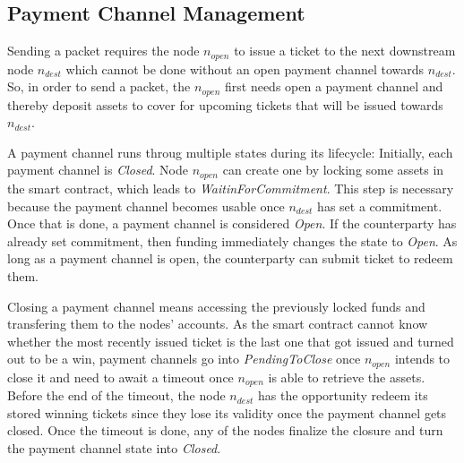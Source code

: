 \subsection{Payment Channel Management}
\label{sec:incentives:channels}

Sending a packet requires the node $n_{open}$ to issue a ticket to the next downstream node $n_{dest}$ which cannot be done without an open payment channel towards $n_{dest}$. So, in order to send a packet, the $n_{open}$ first needs open a payment channel and thereby deposit assets to cover for upcoming tickets that will be issued towards $n_{dest}$.

A payment channel runs throug multiple states during its lifecycle: Initially, each payment channel is \textit{Closed}. Node $n_{open}$ can create one by locking some assets in the smart contract, which leads to \textit{WaitinForCommitment}. This step is necessary because the payment channel becomes usable once $n_{dest}$ has set a commitment. Once that is done, a payment channel is considered \textit{Open}. If the counterparty has already set commitment, then funding immediately changes the state to \textit{Open}. As long as a payment channel is open, the counterparty can submit ticket to redeem them.

Closing a payment channel means accessing the previously locked funds and transfering them to the nodes' accounts. As the smart contract cannot know whether the most recently issued ticket is the last one that got issued and turned out to be a win, payment channels go into \textit{PendingToClose} once $n_{open}$ intends to close it and need to await a timeout once $n_{open}$ is able to retrieve the assets. Before the end of the timeout, the node $n_{dest}$ has the opportunity redeem its stored winning tickets since they lose its validity once the payment channel gets closed. Once the timeout is done, any of the nodes finalize the closure and turn the payment channel state into \textit{Closed}.

